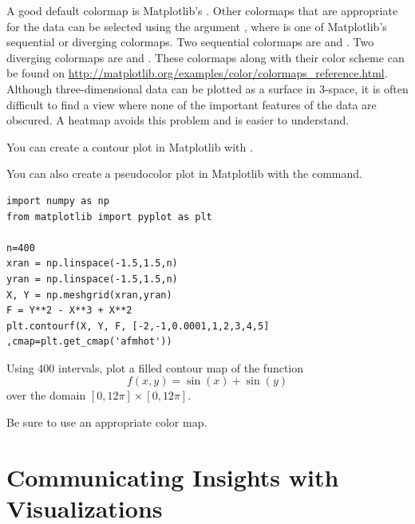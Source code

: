 A good default colormap is Matplotlib's .
Other colormaps that are appropriate for the data can be selected using the argument , where  is one of Matplotlib's sequential or diverging colormaps.
Two sequential colormaps are  and . Two diverging colormaps are  and .
These colormaps along with their color scheme can be found on
\url{http://matplotlib.org/examples/color/colormaps_reference.html}.
Although three-dimensional data can be plotted as a surface in 3-space, it is often difficult to find a view where none of the important features of the data are obscured.
A heatmap avoids this problem and is easier to understand.

You can create a contour plot in Matplotlib with .

You can also create a pseudocolor plot in Matplotlib with the  command.

\begin{lstlisting}
import numpy as np
from matplotlib import pyplot as plt

n=400
xran = np.linspace(-1.5,1.5,n)
yran = np.linspace(-1.5,1.5,n)
X, Y = np.meshgrid(xran,yran)
F = Y**2 - X**3 + X**2
plt.contourf(X, Y, F, [-2,-1,0.0001,1,2,3,4,5] ,cmap=plt.get_cmap('afmhot'))
\end{lstlisting}

\begin{problem} %
Using 400 intervals, plot a filled contour map of the function \[f(x,y) = \sin(x) + \sin(y)\] over the domain $[0,12\pi]\times[0,12\pi]$.

Be sure to use an appropriate color map.
\end{problem}

\section*{Communicating Insights with Visualizations} %

